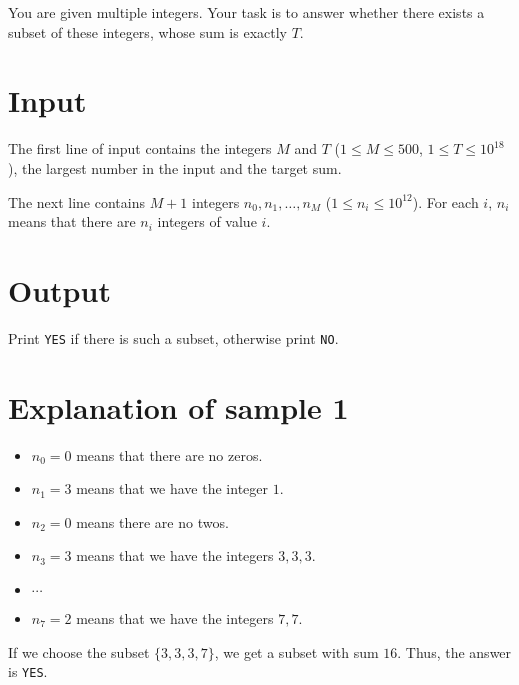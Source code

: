 You are given multiple integers. Your task is to answer whether there exists a subset of these integers, whose
sum is exactly $T$.

\section*{Input}
The first line of input contains the integers $M$ and $T$ ($1 \leq M \leq 500$, $1 \leq T \leq 10^{18}$),
the largest number in the input and the target sum.

The next line contains $M+1$ integers $n_0, n_1, \dots, n_M$ ($1 \leq n_i \leq 10^{12}$). For each $i$,
$n_i$ means that there are $n_i$ integers of value $i$.

\section*{Output}
Print \texttt{YES} if there is such a subset, otherwise print \texttt{NO}.

\section*{Explanation of sample 1}
\begin{itemize}
  \item $n_0=0$ means that there are no zeros.
  \item $n_1=3$ means that we have the integer $1$.
  \item $n_2=0$ means there are no twos.
  \item $n_3=3$ means that we have the integers $3,3,3$.
  \item $\cdots$
  \item $n_7=2$ means that we have the integers $7,7$.
\end{itemize}

If we choose the subset $\{3,3,3,7\}$, we get a subset with sum $16$. Thus, the answer is \texttt{YES}.
